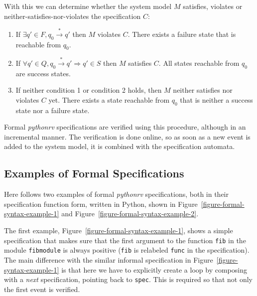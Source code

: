 \begin{mydef}

With this we can determine whether the system model $M$ satisfies, violates or
neither-satisfies-nor-violates the specification $C$:

\begin{enumerate}
  \item If $\exists q' \in F, q_0 \xrightarrow* q'$ then $M$ violates $C$.
    There exists a failure state that is reachable from $q_0$.
  \item If $\forall q' \in Q, q_0 \xrightarrow* q' \Rightarrow q' \in S$ then
    $M$ satisfies $C$. All states reachable from $q_0$ are success states.
  \item If neither condition 1 or condition 2 holds, then $M$ neither satisfies
    nor violates $C$ yet. There exists a state reachable from $q_0$ that is
    neither a success state nor a failure state.
\end{enumerate}

\end{mydef}

Formal \textit{pythonrv} specifications are verified using this procedure,
although in an incremental manner. The verification is done online, so as soon
as a new event is added to the system model, it is combined with the
specification automata.






\subsection{Examples of Formal Specifications}
\label{section-approach-examples-of-formal-specifications}
\lstset{language=Python,numbers=none}

Here follows two examples of formal \textit{pythonrv} specifications, both in
their specification function form, written in Python, shown in
Figure~\ref{figure-formal-syntax-example-1} and
Figure~\ref{figure-formal-syntax-example-2}.

The first example, Figure~\ref{figure-formal-syntax-example-1}, shows a simple
specification that makes sure that the first argument to the function
\texttt{fib} in the module \texttt{fibmodule} is always positive (\texttt{fib}
is relabeled \texttt{func} in the specification). The main difference with the
similar informal specification in Figure~\ref{figure-syntax-example-1} is that
here we have to explicitly create a loop by composing with a \textit{next}
specification, pointing back to \texttt{spec}. This is required so that not
only the first event is verified.

